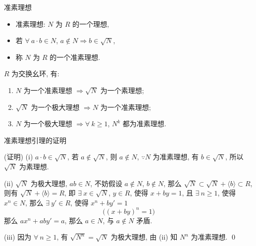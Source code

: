 \begin{frame}{准素理想}

\begin{itemize}
\item 准素理想: $N$ 为 $R$ 的一个理想,
\item 若 $\forall\ a \cdot b \in N$, $a \notin N \Rightarrow b \in \sqrt{N}$,
\item 称 $N$ 为 $R$ 的一个\alert{准素理想}.
\end{itemize}

\pause

\begin{lem}[准素理想]
$R$ 为交换幺环, 有:
\begin{enumerate}
\item[(i)] $N$ 为一个准素理想 $\Longrightarrow \sqrt{N}$ 为一个素理想;
\item[(ii)] $\sqrt{N}$ 为一个极大理想 $\Longrightarrow N$ 为一个准素理想;
\item[(iii)] $N$ 为一个极大理想 $\Longrightarrow \forall\ k \geqslant 1$,
  $N^k$ 都为准素理想.
\end{enumerate}
\end{lem}

\end{frame}


\begin{frame}{准素理想引理的证明}

\startproof[bg=yellow, fg=red](证明)
(i) $a \cdot b \in \sqrt{N}$, 若 $a \notin \sqrt{N}$, 则 $a \notin N$,
$\because N$ 为准素理想, 有 $b \in \sqrt{N}$, 所以 $\sqrt{N}$ 为素理想.

\pause

(ii) $\sqrt{N}$ 为极大理想, $ab \in N$, 不妨假设 $a \notin N$, $b \notin N$,
那么 $\sqrt{N} \subset \sqrt{N} + \langle b \rangle \subset R$,
则有 $\sqrt{N} + \langle b \rangle = R$,
即 $\exists\ x \in \sqrt{N}$, $y \in R$, 使得 $x + by = 1$,
且 $\exists\ n \geqslant 1$, 使得 $x^n \in N$, 那么 $\exists\ y' \in R$,
使得 $x^n + by' = 1$
\[
\big( (x + by)^n = 1 \big)
\]
那么 $a x^n + a b y' = a$, 那么 $a \in N$, 与 $a \notin N$ 矛盾.

\pause

(iii) 因为 $\forall\ n \geqslant 1$, 有 $\sqrt{N^n} = \sqrt{N}$ 为极大理想,
由 (ii) 知 $N^n$ 为准素理想.
\qed

\end{frame}


